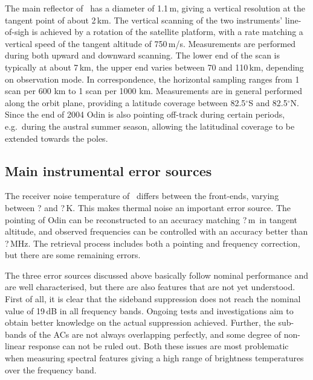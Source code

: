 The main reflector of \smr\ has a diameter of 1.1\,m, giving a
vertical resolution at the tangent point of about 2\,km. The vertical scanning
of the two instruments' line-of-sigh is achieved by a rotation of the satellite
platform, with a rate matching a vertical speed of the tangent altitude of
750\,m/s. Measurements are performed during both upward and downward scanning.
The lower end of the scan is typically at about 7\,km, the upper end varies
between 70 and 110\,km, depending on observation mode. In correspondence,
the horizontal sampling ranges from 1 scan per 600 km to 1 scan per 1000 km.
Measurements are in general performed along the orbit plane, providing a
latitude coverage between 82.5$^{\circ}$S and 82.5$^{\circ}$N. Since the end of
2004 Odin is also pointing off-track during certain periods, e.g.\ during the
austral summer season, allowing the latitudinal coverage to be extended towards
the poles. 


\subsection{Main instrumental error sources}
%
The receiver noise temperature of \smr\ differs between the front-ends, varying
between ? and ?\,K. This makes thermal noise an important
error source. The pointing of Odin can be reconstructed to an accuracy matching
?\,m\ in tangent altitude, and observed frequencies can be
controlled with an accuracy better than ?\,MHz. The retrieval
process includes both a pointing and frequency correction, but there are some
remaining errors.

The three error sources discussed above basically follow nominal performance
and are well characterised, but there are also features that are not yet
understood. First of all, it is clear that the sideband suppression does not
reach the nominal value of 19\,dB in all frequency bands. Ongoing tests and
investigations aim to obtain better knowledge on the actual suppression achieved.
Further, the sub-bands of the ACs are not always overlapping perfectly, and
some degree of non-linear response can not be ruled out. Both these issues are
most problematic when measuring spectral features giving a high range of
brightness temperatures over the frequency band.

